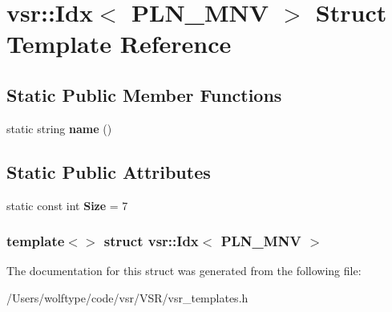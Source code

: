 \hypertarget{structvsr_1_1_idx_3_01_p_l_n___m_n_v_01_4}{\section{vsr\-:\-:Idx$<$ P\-L\-N\-\_\-\-M\-N\-V $>$ Struct Template Reference}
\label{structvsr_1_1_idx_3_01_p_l_n___m_n_v_01_4}
}
\subsection*{Static Public Member Functions}
\begin{DoxyCompactItemize}
\item 
\hypertarget{structvsr_1_1_idx_3_01_p_l_n___m_n_v_01_4_a72ab2fc4d91a7ebb3cc442d11150f9e9}{static string {\bfseries name} ()}\label{structvsr_1_1_idx_3_01_p_l_n___m_n_v_01_4_a72ab2fc4d91a7ebb3cc442d11150f9e9}

\end{DoxyCompactItemize}
\subsection*{Static Public Attributes}
\begin{DoxyCompactItemize}
\item 
\hypertarget{structvsr_1_1_idx_3_01_p_l_n___m_n_v_01_4_a387232053a408d3efc54a230b4645d24}{static const int {\bfseries Size} = 7}\label{structvsr_1_1_idx_3_01_p_l_n___m_n_v_01_4_a387232053a408d3efc54a230b4645d24}

\end{DoxyCompactItemize}
\subsubsection*{template$<$$>$ struct vsr\-::\-Idx$<$ P\-L\-N\-\_\-\-M\-N\-V $>$}



The documentation for this struct was generated from the following file\-:\begin{DoxyCompactItemize}
\item 
/\-Users/wolftype/code/vsr/\-V\-S\-R/vsr\-\_\-templates.\-h\end{DoxyCompactItemize}
